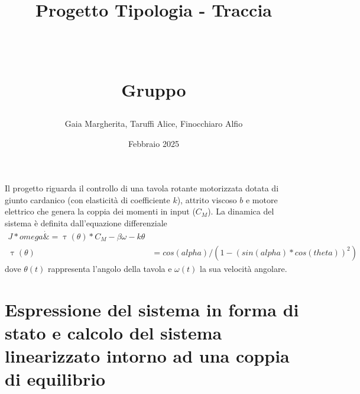 \documentclass[a4paper, 11pt]{article}
\title{ \vspace{-1in}
		\huge \strut \coursename \strut 
		\\
		\Large  \strut Progetto Tipologia \tipology - Traccia \trace 
		\\
		\Large  \strut \projectname\strut
		\\
		\Large  \strut Gruppo \group\strut
		\vspace{-0.4cm}
}
\author{Gaia Margherita, Taruffi Alice, Finocchiaro Alfio}
\date{Febbraio 2025}
\begin{document}
\maketitle
\vspace{-0.5cm}

Il progetto riguarda il controllo di una tavola rotante motorizzata dotata di giunto cardanico (con elasticità di  coefficiente $k$), attrito viscoso $b$ e motore elettrico che genera la coppia dei momenti in input ($C_M$). La dinamica del sistema è definita dall'equazione differenziale
%
\begin{subequations}\label{eq:system}
\begin{align}
	J*omega\dot &= \uptau(\theta) * C_M - \beta\omega - k\theta \\
	\uptau(\theta) &= cos(alpha)/ (1 - ( sin(alpha) * cos(theta) )^2)
\end{align}
\end{subequations}
%
dove $\theta(t)$ rappresenta l'angolo della tavola e $\omega(t)$ la sua velocità angolare.


\section{Espressione del sistema in forma di stato e calcolo del sistema linearizzato intorno ad una coppia di equilibrio}
\end{document}
